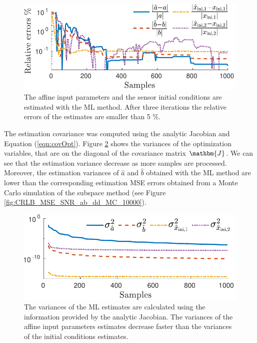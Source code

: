 {{\begin{figure}[!htbp]
\centering
\includegraphics[width=1\columnwidth]{./ChapterRampInput/fig/Fig_7.pdf} 
\caption{ \label{fig:rele_lo_40dB_s10} The affine input parameters and the sensor initial conditions are estimated with the ML method. After three iterations the relative errors of the estimates are smaller than 5 \%.  }
\end{figure}

The estimation covariance was computed using the analytic Jacobian and Equation (\ref{eqn:covOpt}).
Figure \ref{fig:cov_lo_40dB_s1} shows the variances of the optimization variables, that are on the diagonal of the covariance matrix $\mathbm{J}$. 
We can see that the estimation variance decrease as more samples are processed.
Moreover, the estimation variances of $\widehat{a}$ and $\widehat{b}$ obtained with the ML method are lower than 
the corresponding estimation MSE errors obtained from a Monte Carlo simulation of the subspace method (see Figure \ref{fig:CRLB_MSE_SNR_ab_dd_MC_10000}).
  
\begin{figure}[!htbp]
\centering
\includegraphics[width=1\columnwidth]{./ChapterRampInput/fig/Fig_8.pdf} 
\caption{ \label{fig:cov_lo_40dB_s1} The variances of the ML estimates are calculated using the information provided by the analytic Jacobian. The variances of the affine input parameters estimates decrease faster than the variances of the initial conditions estimates.  }
\end{figure}

}}
